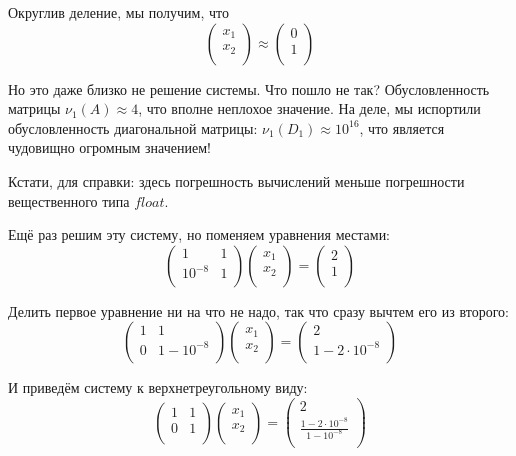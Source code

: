 \documentclass{article}
\begin{document}
\begin{example}
	Округлив деление, мы получим, что
	\[
		\begin{pmatrix}
			x_1 \\
			x_2 \\
		\end{pmatrix}
		\approx
		\begin{pmatrix}
			0 \\
			1 \\
		\end{pmatrix}
	\]

	Но это даже близко не решение системы. Что пошло не так? Обусловленность
	матрицы $\nu_1(A)\approx 4$, что вполне неплохое значение. На деле, мы
	испортили обусловленность диагональной матрицы: $\nu_1(D_1)\approx
	10^{16}$, что является чудовищно огромным значением!

	Кстати, для справки: здесь погрешность вычислений меньше погрешности
	вещественного типа $float$.

	Ещё раз решим эту систему, но поменяем уравнения местами:
	\[
		\begin{pmatrix}
			1	& 1	\\
			10^{-8}	& 1	\\
		\end{pmatrix}
		\begin{pmatrix}
			x_1 \\
			x_2 \\
		\end{pmatrix}
		=
		\begin{pmatrix}
			2 \\
			1 \\
		\end{pmatrix}
	\]

	Делить первое уравнение ни на что не надо, так что сразу вычтем его
	из второго:
	\[
		\begin{pmatrix}
			1	& 1	\\
			0	&1-10^{-8}\\
		\end{pmatrix}
		\begin{pmatrix}
			x_1 \\
			x_2 \\
		\end{pmatrix}
		=
		\begin{pmatrix}
			2 \\
			1-2\cdot 10^{-8} \\
		\end{pmatrix}
	\]

	И приведём систему к верхнетреугольному виду:
	\[
		\begin{pmatrix}
			1	& 1	\\
			0	& 1	\\
		\end{pmatrix}
		\begin{pmatrix}
			x_1 \\
			x_2 \\
		\end{pmatrix}
		=
		\begin{pmatrix}
			2 \\
			\frac{1-2\cdot 10^{-8}}{1-10^{-8}} \\
		\end{pmatrix}
	\]


\end{example}
\end{document}
